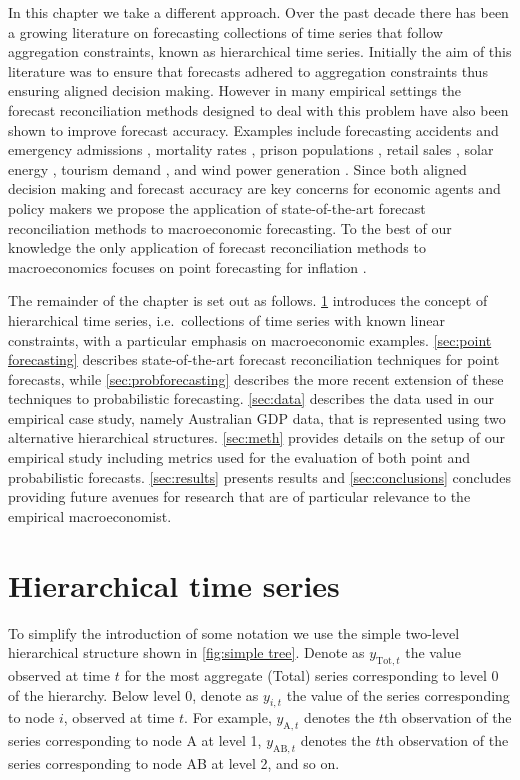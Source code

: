 {In this chapter we take a different approach. Over the past decade there has been a growing literature on forecasting collections of time series that follow aggregation constraints, known as hierarchical time series. Initially the aim of this literature was to ensure that forecasts adhered to aggregation constraints thus ensuring aligned decision making. However in many empirical settings the forecast reconciliation methods designed to deal with this problem have also been shown to improve forecast accuracy. Examples include forecasting accidents and emergency admissions \citep{AthEtAl2017}, mortality rates \citep{ShaHyn2017}, prison populations \citep{AthEtAl2019}, retail sales \citep{VilPed2018}, solar energy \citep{YanEtAl2017,YagEtAl2019}, tourism demand \citep{AthEtAl2009, HynEtAl2011, WicEtAl2019}, and wind power generation \citep{ZhaDon2018}. Since both aligned decision making and forecast accuracy are key concerns for economic agents and policy makers we propose the application of state-of-the-art forecast reconciliation methods to macroeconomic forecasting. To the best of our knowledge the only application of forecast reconciliation methods to macroeconomics focuses on point forecasting for inflation \citep{capistran2010multi,weiss2018essays}.

The remainder of the chapter is set out as follows. \ref{sec:Hier ts} introduces the concept of hierarchical time series, i.e.\ collections of time series with known linear constraints, with a particular emphasis on macroeconomic examples. \ref{sec:point forecasting} describes state-of-the-art forecast reconciliation techniques for point forecasts, while \ref{sec:probforecasting} describes the more recent extension of these techniques to probabilistic forecasting. \ref{sec:data} describes the data used in our empirical case study, namely Australian GDP data, that is represented using two alternative hierarchical structures. \ref{sec:meth} provides details on the setup of our empirical study including metrics used for the evaluation of both point and probabilistic forecasts. \ref{sec:results} presents results and \ref{sec:conclusions} concludes providing future avenues for research that are of particular relevance to the empirical macroeconomist.

\section{Hierarchical time series}\label{sec:Hier ts}

To simplify the introduction of some notation we use the simple two-level hierarchical structure shown in \ref{fig:simple tree}. Denote as $y_{\text{Tot},t}$ the value observed at time $t$ for the most aggregate (Total) series corresponding to level 0 of the hierarchy. Below level 0, denote as $y_{i,t}$ the value of the series corresponding to node $i$, observed at time $t$. For example, $y_{\text{A},t}$ denotes the $t$th observation of the series corresponding to node A at level 1, $y_{\text{AB},t}$ denotes the $t$th observation of the series corresponding to node AB at level 2, and so on.

}
